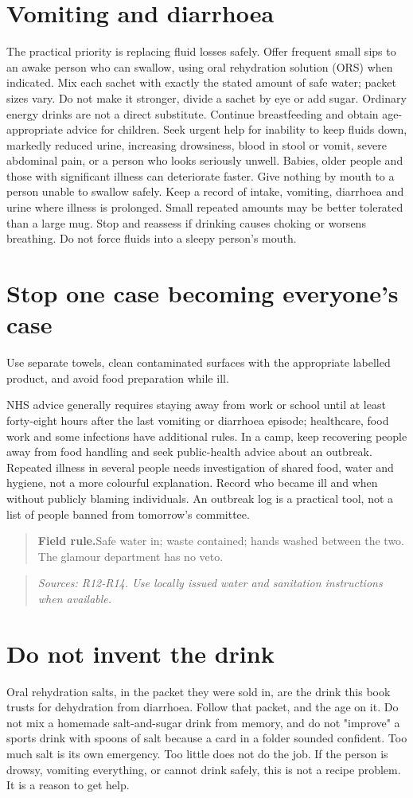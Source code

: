 \documentclass[10pt,openright]{book}
\newcommand{\fieldrule}[1]{\begin{quote}\textbf{Field rule.}\enspace #1\end{quote}}
\begin{document}
\section*{Vomiting and diarrhoea}
The practical priority is replacing fluid losses safely. Offer frequent small sips to an awake person who can swallow, using oral rehydration solution (ORS) when indicated. Mix each sachet with exactly the stated amount of safe water; packet sizes vary. Do not make it stronger, divide a sachet by eye or add sugar. Ordinary energy drinks are not a direct substitute. Continue breastfeeding and obtain age-appropriate advice for children. Seek urgent help for inability to keep fluids down, markedly reduced urine, increasing drowsiness, blood in stool or vomit, severe abdominal pain, or a person who looks seriously unwell. Babies, older people and those with significant illness can deteriorate faster. Give nothing by mouth to a person unable to swallow safely. Keep a record of intake, vomiting, diarrhoea and urine where illness is prolonged. Small repeated amounts may be better tolerated than a large mug. Stop and reassess if drinking causes choking or worsens breathing. Do not force fluids into a sleepy person's mouth.

\section*{Stop one case becoming everyone's case}
Use separate towels, clean contaminated surfaces with the appropriate labelled product, and avoid food preparation while ill.

NHS advice generally requires staying away from work or school until at least forty-eight hours after the last vomiting or diarrhoea episode; healthcare, food work and some infections have additional rules. In a camp, keep recovering people away from food handling and seek public-health advice about an outbreak. Repeated illness in several people needs investigation of shared food, water and hygiene, not a more colourful explanation. Record who became ill and when without publicly blaming individuals. An outbreak log is a practical tool, not a list of people banned from tomorrow's committee.

\fieldrule{Safe water in; waste contained; hands washed between the two. The glamour department has no veto.}
\begin{quote}\emph{Sources: R12-R14. Use locally issued water and sanitation instructions when available.}\end{quote}
\section*{Do not invent the drink}
Oral rehydration salts, in the packet they were sold in, are the drink this book trusts for dehydration from diarrhoea. Follow that packet, and the age on it. Do not mix a homemade salt-and-sugar drink from memory, and do not "improve" a sports drink with spoons of salt because a card in a folder sounded confident. Too much salt is its own emergency. Too little does not do the job. If the person is drowsy, vomiting everything, or cannot drink safely, this is not a recipe problem. It is a reason to get help.
\end{document}
